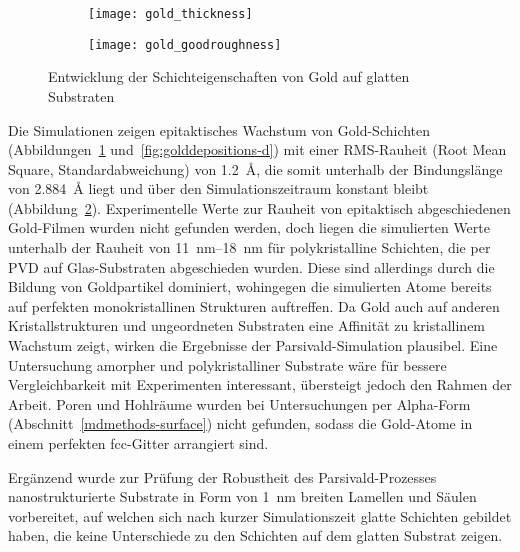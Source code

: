 \begin{figure}[t]
  \captionsetup[subfigure]{singlelinecheck=false}
  \def\subfigwidth{0.49\textwidth}

  \begin{subfigure}[t]{\subfigwidth}
    \texttt{[image: gold\_thickness]}
    \label{fig:goldsmooth-a}
  \end{subfigure}
  \hfill
  \begin{subfigure}[t]{\subfigwidth}
    \texttt{[image: gold\_goodroughness]}
    \label{fig:goldsmooth-b}
  \end{subfigure}

  \caption[Schichteigenschaften von Gold auf glatten Substraten]{
    Entwicklung der Schichteigenschaften von Gold auf glatten Substraten
  }
  \label{fig:goldsmooth}

\end{figure}

Die Simulationen zeigen epitaktisches Wachstum von Gold-Schichten (Abbildungen~\ref{fig:goldsmooth-a} und~\ref{fig:golddepositions-d}) mit einer RMS-Rauheit (Root Mean Square, Standardabweichung) von \SI{1.2}{\angstrom}, die somit unterhalb der Bindungslänge von \SI{2.884}{\angstrom} liegt und über den Simulationszeitraum konstant bleibt (Abbildung~\ref{fig:goldsmooth-b}).
Experimentelle Werte zur Rauheit von epitaktisch abgeschiedenen Gold-Filmen wurden nicht gefunden werden, doch liegen die simulierten Werte unterhalb der Rauheit von \SIrange{11}{18}{\nano\meter} für polykristalline Schichten, die per PVD auf Glas-Substraten abgeschieden wurden\cite{svorcik_annealing_2011}.
Diese sind allerdings durch die Bildung von Goldpartikel dominiert, wohingegen die simulierten Atome bereits auf perfekten monokristallinen Strukturen auftreffen.
Da Gold auch auf anderen Kristallstrukturen und ungeordneten Substraten eine Affinität zu kristallinem Wachstum zeigt\cite{gottsche_uber_1956,everitt_evolution_2000}, wirken die Ergebnisse der Parsivald-Simulation plausibel.
Eine Untersuchung amorpher und polykristalliner Substrate wäre für bessere Vergleichbarkeit mit Experimenten\cite{adamov_electrical_1974} interessant, übersteigt jedoch den Rahmen der Arbeit.
Poren und Hohlräume wurden bei Untersuchungen per Alpha-Form (Abschnitt~\ref{mdmethods-surface}) nicht gefunden, sodass die Gold-Atome in einem perfekten fcc-Gitter arrangiert sind.

Ergänzend wurde zur Prüfung der Robustheit des Parsivald-Prozesses nanostrukturierte Substrate in Form von \SI{1}{\nano\meter} breiten Lamellen und Säulen vorbereitet, auf welchen sich nach kurzer Simulationszeit glatte Schichten gebildet haben, die keine Unterschiede zu den Schichten auf dem glatten Substrat zeigen.

